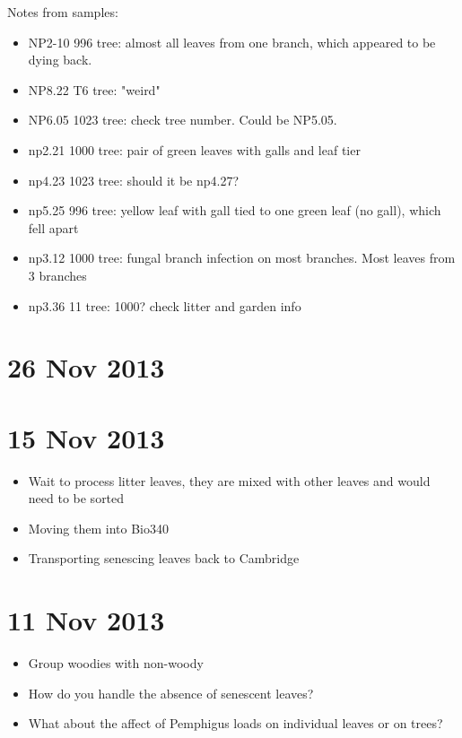 \documentclass[12pt]{article}
\begin{document}
Notes from samples:

\begin{itemize}
\item NP2-10 996 tree: almost all leaves from one branch, which
  appeared to be dying back.
\item NP8.22 T6 tree: "weird"
\item NP6.05 1023 tree: check tree number. Could be NP5.05.
\item np2.21 1000 tree: pair of green leaves with galls and leaf tier
\item np4.23 1023 tree: should it be np4.27?
\item np5.25 996 tree: yellow leaf with gall tied to one green leaf
  (no gall), which fell apart
\item np3.12 1000 tree: fungal branch infection on most branches. Most
  leaves from 3 branches
\item np3.36 11 tree: 1000? check litter and garden info
\end{itemize}

\section{26 Nov 2013}



\section{15 Nov 2013}
\begin{itemize}
\item Wait to process litter leaves, they are mixed with other leaves
  and would need to be sorted
\item Moving them into Bio340
\item Transporting senescing leaves back to Cambridge
\end{itemize}

\section{11 Nov 2013}

\begin{itemize}
\item Group woodies with non-woody
\item How do you handle the absence of senescent leaves?
\item What about the affect of Pemphigus loads on individual leaves or
  on trees?
\end{itemize}
\end{document}
